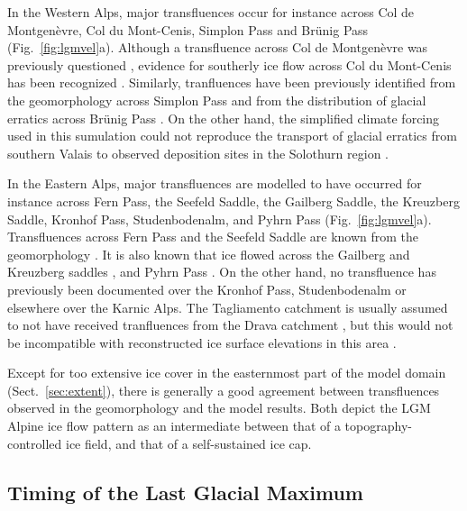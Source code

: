 \documentclass[tc, manuscript]{copernicus}
\begin{document}
    In the Western Alps, major transfluences occur for instance across Col de
    Montgenèvre, Col du Mont-Cenis, Simplon Pass and Brünig Pass
    (Fig.~\ref{fig:lgmvel}a). Although a transfluence across Col de Montgenèvre
    was previously questioned \citep[Fig.~2]{Cossart.etal.2012}, evidence for
    southerly ice flow across Col du Mont-Cenis has been recognized
    \citep[Fig.~3.18, p.~284]{Onde.1938, Coutterand.2010}. Similarly,
    tranfluences have been previously identified from the geomorphology across
    Simplon Pass \citep{Kelly.etal.2004} and from the distribution of glacial
    erratics across Brünig Pass \citep{Jackli.1962}. On the other hand, the
    simplified climate forcing used in this sumulation could not reproduce
    the transport of glacial erratics from southern Valais to observed
    deposition sites in the Solothurn region \citep[cf.~][]{Jouvet.etal.2017a}.

    In the Eastern Alps, major transfluences are modelled to have occurred for
    instance across Fern Pass, the Seefeld Saddle, the Gailberg Saddle, the
    Kreuzberg Saddle, Kronhof Pass, Studenbodenalm, and Pyhrn Pass
    (Fig.~\ref{fig:lgmvel}a). Transfluences across Fern Pass and the Seefeld
    Saddle are known from the geomorphology
    \citep[Fig.~2.4]{Penck.Bruckner.1909, Husen.2011}. It is also known that
    ice flowed across the Gailberg and Kreuzberg saddles \citep{Husen.1985},
    and Pyhrn Pass \citep[Fig.~2.5]{Husen.2011}.
    On the other hand, no transfluence has previously been documented over the
    Kronhof Pass, Studenbodenalm or elsewhere over the Karnic Alps.
    The Tagliamento catchment is usually assumed to not have
    received tranfluences from the Drava catchment \citep{Monegato.etal.2007},
    but this would not be incompatible with reconstructed ice surface
    elevations in this area \citep{Husen.1987}.

    Except for too extensive ice cover in the easternmost part of the model
    domain (Sect.~\ref{sec:extent}), there is generally a good agreement
    between transfluences observed in the geomorphology and the model results.
    Both depict the LGM Alpine ice flow pattern as an intermediate between that
    of a topography-controlled ice field, and that of a self-sustained ice cap.


\subsection{Timing of the Last Glacial Maximum}
\label{sec:timing}
\end{document}
